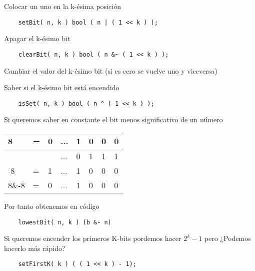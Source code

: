Colocar un uno en la k-ésima posición
\begin{lstlisting}
    setBit( n, k ) bool ( n | ( 1 << k ) );
\end{lstlisting}

Apagar el k-ésimo bit
\begin{lstlisting}
    clearBit( n, k ) bool ( n &~ ( 1 << k ) );
\end{lstlisting}

Cambiar el valor del k-ésimo bit (si es cero se vuelve uno y viceversa)

Saber si el k-ésimo bit está encendido 
\begin{lstlisting}
    isSet( n, k ) bool ( n ^ ( 1 << k ) );
\end{lstlisting}

Si queremos saber en constante el bit menos significativo de un número 

\begin{longtable}[c]{llllllll}
    \cellcolor[HTML]{FFFFFF}8                              & \cellcolor[HTML]{FFFFFF}=                        & \cellcolor[HTML]{FFFFFF}0                        & \cellcolor[HTML]{FFFFFF}... & \cellcolor[HTML]{FFFFFF}1 & 0 & 0 & 0 \\
    \endfirsthead
    \endhead
    \cellcolor[HTML]{FFFFFF}{\color[HTML]{333333} $\sim$8} & \cellcolor[HTML]{FFFFFF}{\color[HTML]{333333} =} & \cellcolor[HTML]{FFFFFF}{\color[HTML]{333333} 1} & \cellcolor[HTML]{FFFFFF}... & \cellcolor[HTML]{FFFFFF}0 & 1 & 1 & 1 \\
    -8                                                     & =                                                & 1                                                & ...                         & 1                         & 0 & 0 & 0 \\
    8\&-8                                                  & =                                                & 0                                                & ...                         & 1                         & 0 & 0 & 0
\end{longtable}

Por tanto obtenemos en código 
\begin{lstlisting}
    lowestBit( n, k ) (b &- n)
\end{lstlisting}


Si queremos encender los primeros K-bits pordemos hacer $2^{k} - 1$ pero ¿Podemos hacerlo más rápido? \break 

\begin{lstlisting}
    setFirstK( k ) ( ( 1 << k ) - 1);
\end{lstlisting}

